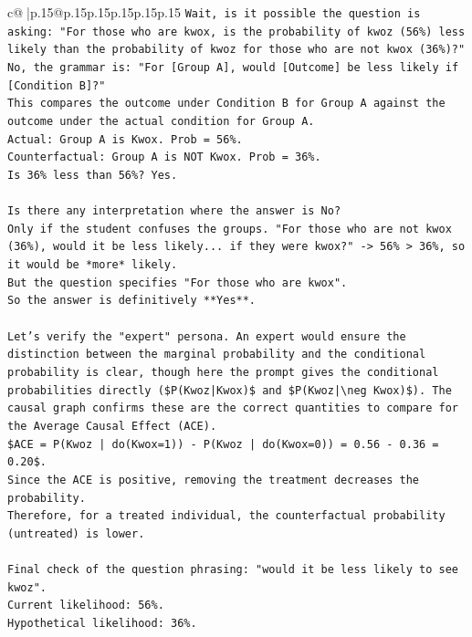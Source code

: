 \documentclass{article}
\begin{document}
{\begin{supertabular}{c@{$\;$}|p{.15\linewidth}@{}p{.15\linewidth}p{.15\linewidth}p{.15\linewidth}p{.15\linewidth}p{.15\linewidth}}
{{{\texttt{Wait, is it possible the question is asking: "For those who are kwox, is the probability of kwoz (56\%) less likely than the probability of kwoz for those who are not kwox (36\%)?"} \\
\texttt{No, the grammar is: "For {[}Group A{]}, would {[}Outcome{]} be less likely if {[}Condition B{]}?"} \\
\texttt{This compares the outcome under Condition B for Group A against the outcome under the actual condition for Group A.} \\
\texttt{Actual: Group A is Kwox. Prob = 56\%.} \\
\texttt{Counterfactual: Group A is NOT Kwox. Prob = 36\%.} \\
\texttt{Is 36\% less than 56\%? Yes.} \\
\\ 
\texttt{Is there any interpretation where the answer is No?} \\
\texttt{Only if the student confuses the groups. "For those who are not kwox (36\%), would it be less likely... if they were kwox?" {-}> 56\% > 36\%, so it would be *more* likely.} \\
\texttt{But the question specifies "For those who are kwox".} \\
\texttt{So the answer is definitively **Yes**.} \\
\\ 
\texttt{Let's verify the "expert" persona. An expert would ensure the distinction between the marginal probability and the conditional probability is clear, though here the prompt gives the conditional probabilities directly (\$P(Kwoz|Kwox)\$ and \$P(Kwoz|\textbackslash{}neg Kwox)\$). The causal graph confirms these are the correct quantities to compare for the Average Causal Effect (ACE).} \\
\texttt{\$ACE = P(Kwoz | do(Kwox=1)) {-} P(Kwoz | do(Kwox=0)) = 0.56 {-} 0.36 = 0.20\$.} \\
\texttt{Since the ACE is positive, removing the treatment decreases the probability.} \\
\texttt{Therefore, for a treated individual, the counterfactual probability (untreated) is lower.} \\
\\ 
\texttt{Final check of the question phrasing: "would it be less likely to see kwoz".} \\
\texttt{Current likelihood: 56\%.} \\
\texttt{Hypothetical likelihood: 36\%.} \\
}}}
\end{supertabular}}
\end{document}
